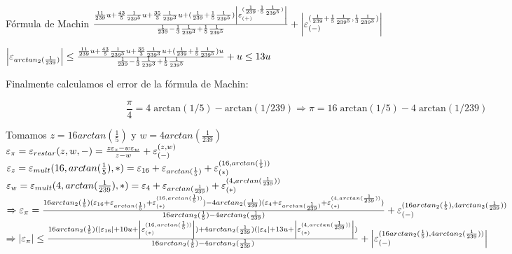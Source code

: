 \begin{subsection}{Fórmula de Machin}
	$\frac{\frac{11}{239}u + \frac{43}{5}\frac{1}{239^5}u + \frac{35}{3}\frac{1}{239^3}u + (\frac{1}{239}+\frac{1}{5}\frac{1}{239^5})\left|\varepsilon _{({+})}^{({\frac{1}{239},\frac{1}{5}\frac{1}{239^5}})}\right|}{\frac{1}{239}-\frac{1}{3}\frac{1}{239^3}+\frac{1}{5}\frac{1}{239^5}} + \left|\varepsilon _{({-})}^{({\frac{1}{239}+\frac{1}{5}\frac{1}{239^5},\frac{1}{3}\frac{1}{239^3}})}\right|$\\
	
	\pa
	
	$\left|\varepsilon _{arctan_2(\frac{1}{239})}\right| \leq \frac{\frac{11}{239}u + \frac{43}{5}\frac{1}{239^5}u + \frac{35}{3}\frac{1}{239^3}u + (\frac{1}{239}+\frac{1}{5}\frac{1}{239^5})u}{\frac{1}{239}-\frac{1}{3}\frac{1}{239^3}+\frac{1}{5}\frac{1}{239^5}} + u \leq 13u$\\
	
	\pa
	
	Finalmente calculamos el error de la fórmula de Machin:
	
	\begin{equation*}
		\frac{\pi}{4} = 4 \; \mathrm{arctan}(1/5) - \mathrm{arctan}(1/239) \Rightarrow \pi = 16 \; \mathrm{arctan}(1/5) - 4 \; \mathrm{arctan}(1/239)
    \end{equation*}
	
	Tomamos $z=16arctan(\frac{1}{5})$ y $w=4arctan(\frac{1}{239})$\\
	
	$\varepsilon _{\pi} = \varepsilon _{restar}({z,w,-}) = \frac{z\varepsilon _{z} - w\varepsilon _{w}}{z-w} + \varepsilon _{({-})}^{({z,w})}$\\
	
	$\varepsilon _{z} = \varepsilon _{mult}({16,arctan(\frac{1}{5}),*}) = \varepsilon _{16} + \varepsilon _{arctan(\frac{1}{5})} + \varepsilon _{({*})}^{({16,arctan(\frac{1}{5})})}$\\
	
	$\varepsilon _{w} = \varepsilon _{mult}({4,arctan(\frac{1}{239}),*}) = \varepsilon _{4} + \varepsilon _{arctan(\frac{1}{239})} + \varepsilon _{({*})}^{({4,arctan(\frac{1}{239})})}$\\
	
	$\Rightarrow \varepsilon _{\pi} = \frac{16arctan_2(\frac{1}{5})(\varepsilon _{16} + \varepsilon _{arctan(\frac{1}{5})} + \varepsilon _{({*})}^{({16,arctan(\frac{1}{5})})}) - 4arctan_2(\frac{1}{239})(\varepsilon _{4} + \varepsilon _{arctan(\frac{1}{239})} + \varepsilon _{({*})}^{({4,arctan(\frac{1}{239})})})}{16arctan_2(\frac{1}{5})-4arctan_2(\frac{1}{239})} + \varepsilon _{({-})}^{({16arctan_2(\frac{1}{5}),4arctan_2(\frac{1}{239})})}$\\
	
	$\Rightarrow \left|\varepsilon _{\pi}\right| \leq \frac{16arctan_2(\frac{1}{5})(|\varepsilon _{16}| + 10u + \left|\varepsilon _{({*})}^{({16,arctan(\frac{1}{5})})}\right|) + 4arctan_2(\frac{1}{239})(|\varepsilon _{4}| + 13u + \left|\varepsilon _{({*})}^{({4,arctan(\frac{1}{239})})}\right|)}{16arctan_2(\frac{1}{5})-4arctan_2(\frac{1}{239})} + \left|\varepsilon _{({-})}^{({16arctan_2(\frac{1}{5}),4arctan_2(\frac{1}{239})})}\right|$\\
	

\end{subsection}
